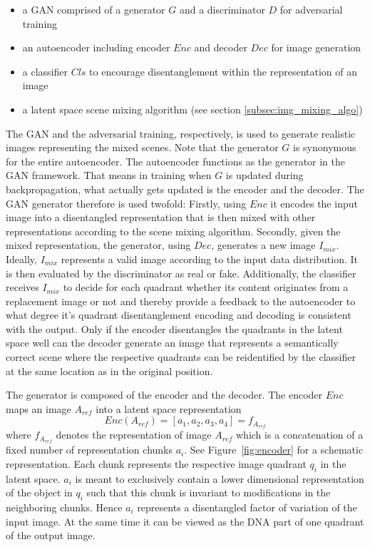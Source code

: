 \documentclass[a4paper,12pt]{report}
\begin{document}
\begin{itemize}
   \item a GAN comprised of a generator $G$ and a discriminator $D$ for adversarial training
   \item an autoencoder including encoder $Enc$ and decoder $Dec$ for image generation
   \item a classifier $Cls$ to encourage disentanglement within the representation of an image
   \item a latent space scene mixing algorithm (see section \ref{subsec:img_mixing_algo})
\end{itemize}
 
The GAN and the adversarial training, respectively, is used to generate realistic images representing the mixed scenes. Note that the generator $G$ is synonymous for the entire autoencoder. The autoencoder functions as the generator in the GAN framework. That means in training when $G$ is updated during backpropagation, what actually gets updated is the encoder and the decoder. The GAN generator therefore is used twofold: Firstly, using $Enc$ it encodes the input image into a disentangled representation that is then mixed with other representations according to the scene mixing algorithm. Secondly, given the mixed representation, the generator, using $Dec$, generates a new image $I_{mix}$. Ideally, $I_{mix}$ represents a valid image according to the input data distribution. It is then evaluated by the discriminator as real or fake. Additionally, the classifier receives $I_{mix}$ to decide for each quadrant whether its content originates from a replacement image or not and thereby provide a feedback to the autoencoder to what degree it's quadrant disentanglement encoding and decoding is consistent with the output. Only if the encoder disentangles the quadrants in the latent space well can the decoder generate an image that represents a semantically correct scene where the respective quadrants can be reidentified by the classifier at the same location as in the original position. 

The generator is composed of the encoder and the decoder. The encoder $Enc$ maps an image $A_{ref}$ into a latent space representation
\begin{equation} \label{eq:2}
    Enc(A_{ref}) = [a_1, a_2, a_3, a_4] = f_{A_{ref}}
\end{equation}
where $f_{A_{ref}}$ denotes the representation of image $A_{ref}$ which is a concatenation of a fixed number of representation chunks $a_i$. See Figure~\ref{fig:encoder} for a schematic representation. Each chunk represents the respective image quadrant $q_i$ in the latent space. $a_i$ is meant to exclusively contain a lower dimensional representation of the object in $q_i$ such that this chunk is invariant to modifications in the neighboring chunks. Hence $a_i$ represents a disentangled factor of variation of the input image. At the same time it can be viewed as the DNA part of one quadrant of the output image.
\end{document}
